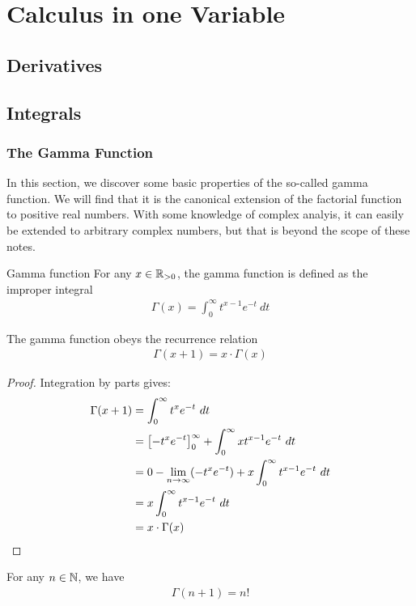 \part{Calculus in one Variable}
\chapter{Derivatives}
\chapter{Integrals}
\section{The Gamma Function}
In this section, we discover some basic properties of the so-called gamma function. We will find that it is the canonical extension of the factorial function to positive real numbers. With some knowledge of complex analyis, it can easily be extended to arbitrary complex numbers, but that is beyond the scope of these notes.
\begin{importantdefinition}{Gamma function}{}
	For any $x \in \mathbb{R}_{> 0}$, the gamma function is defined as the improper integral
	\begin{align*}
		\Gamma(x) = \int_0^\infty t^{x-1} e^{-t} ~dt
	\end{align*}
\end{importantdefinition}
\begin{theorem}
	The gamma function obeys the recurrence relation
	\begin{align*}
		\Gamma(x + 1) = x \cdot \Gamma(x)
	\end{align*}
\end{theorem}
\begin{proof}
	Integration by parts gives:
	\begin{align*}
		\Gamma(x+1)
		&= \int_{0}^\infty t^x e^{-t} ~dt\\
		&= \qty[-t^xe^{-t}]_0^\infty
		+ \int_0^\infty xt^{x-1} e^{-t} ~dt\\
		&= 0 - \lim_{n \to \infty} (-t^xe^{-t})
		+ x \int_0^\infty t^{x-1} e^{-t} ~dt\\
		&= x \int_0^\infty t^{x-1} e^{-t} ~dt\\
		&= x \cdot \Gamma(x)
	\end{align*}
\end{proof}
\pagebreak
\begin{corollary}
	For any $n \in \mathbb{N}$, we have
	\begin{align*}
		\Gamma(n + 1) = n!
	\end{align*}
\end{corollary}
